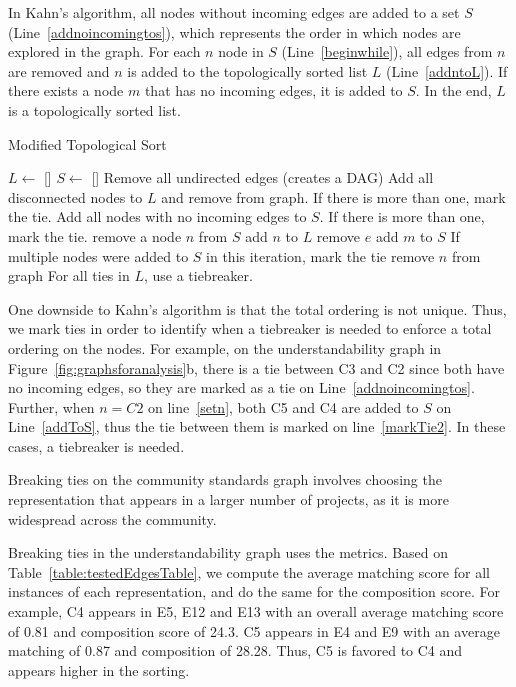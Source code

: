 In Kahn's algorithm, all nodes without incoming edges are added to a set $S$ (Line~\ref{addnoincomingtos}), which represents the order in which nodes are explored in the graph. For each $n$ node in $S$ (Line~\ref{beginwhile}), all edges from $n$ are removed and $n$ is added to the topologically sorted list $L$ (Line~\ref{addntoL}). If there exists a node $m$ that has no incoming edges, it is added to $S$.  In the end, $L$ is a topologically sorted list.

\begin{algorithm}
  \caption{Modified Topological Sort}\label{topological}
  \begin{algorithmic}[1]
\State  $L \gets$ []
\State $S \gets$ []
\State Remove all undirected edges (creates a DAG)
\State Add all disconnected nodes to $L$ and remove from graph. If there is more than one, mark the tie. \label{markTie1}
\State Add all nodes with no incoming edges to $S$. If there is more than one, mark the tie. \label{addnoincomingtos}
 \label{beginwhile}
	\State remove a node $n$ from $S$ \label{setn}
	\State add $n$ to $L$  \label{addntoL}
		\State remove $e$
			\State add $m$ to $S$ \label{addToS}
		\EndIf
	\EndFor
	\State If multiple nodes were added to $S$ in this iteration, mark the tie \label{markTie2}
	\State remove $n$ from graph
\EndWhile
\State For all ties in $L$, use a tiebreaker.
  \end{algorithmic}
\end{algorithm}

One downside to Kahn's algorithm is that the total ordering is not unique. Thus, we mark ties in order to identify when a tiebreaker is needed to enforce a total ordering on the nodes. For example, on the understandability graph in Figure~\ref{fig:graphsforanalysis}b, there is a tie between C3 and C2 since both have no incoming edges, so they are marked as a tie on Line~\ref{addnoincomingtos}. Further, when $n=C2$ on line~\ref{setn}, both C5 and C4 are added to $S$ on Line~\ref{addToS}, thus the tie between them is marked on line~\ref{markTie2}. In these cases, a tiebreaker is needed.

Breaking ties on the community standards graph involves choosing the representation that appears in a larger number of projects, as it is more widespread across the community.

Breaking ties in the understandability graph uses the metrics. Based on Table~\ref{table:testedEdgesTable}, we compute the average matching score for all instances of each representation, and do the same for the composition score. For example, C4 appears in E5, E12 and E13 with an overall average matching score of 0.81 and composition score of 24.3. C5 appears in E4 and E9 with an average matching of 0.87 and composition of 28.28. Thus, C5 is favored to C4 and appears higher in the sorting.


